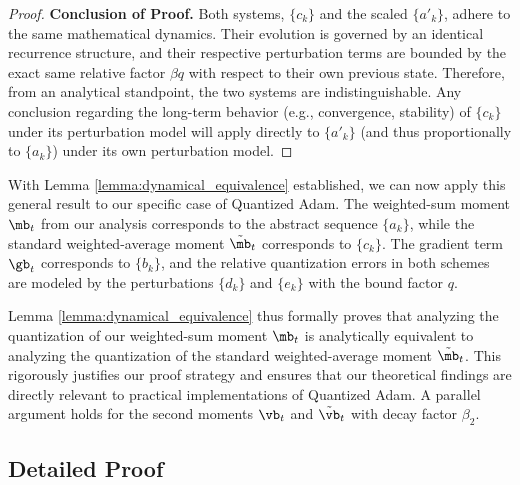 \documentclass[11pt, letterpaper]{article}
\begin{document}
\begin{proof}
\textbf{Conclusion of Proof.}
Both systems, $\{c_k\}$ and the scaled $\{a'_k\}$, adhere to the same mathematical dynamics. Their evolution is governed by an identical recurrence structure, and their respective perturbation terms are bounded by the exact same relative factor $\beta q$ with respect to their own previous state. Therefore, from an analytical standpoint, the two systems are indistinguishable. Any conclusion regarding the long-term behavior (e.g., convergence, stability) of $\{c_k\}$ under its perturbation model will apply directly to $\{a'_k\}$ (and thus proportionally to $\{a_k\}$) under its own perturbation model.
\end{proof}

With Lemma \ref{lemma:dynamical_equivalence} established, we can now apply this general result to our specific case of Quantized Adam. The weighted-sum moment $\mb_t$ from our analysis corresponds to the abstract sequence $\{a_k\}$, while the standard weighted-average moment $\tilde{\mb}_t$ corresponds to $\{c_k\}$. The gradient term $\gb_t$ corresponds to $\{b_k\}$, and the relative quantization errors in both schemes are modeled by the perturbations $\{d_k\}$ and $\{e_k\}$ with the bound factor $q$.

Lemma \ref{lemma:dynamical_equivalence} thus formally proves that analyzing the quantization of our weighted-sum moment $\mb_t$ is analytically equivalent to analyzing the quantization of the standard weighted-average moment $\tilde{\mb}_t$. This rigorously justifies our proof strategy and ensures that our theoretical findings are directly relevant to practical implementations of Quantized Adam. A parallel argument holds for the second moments $\vb_t$ and $\tilde{\vb}_t$ with decay factor $\beta_2$.

\subsection{Detailed Proof}
\end{document}
